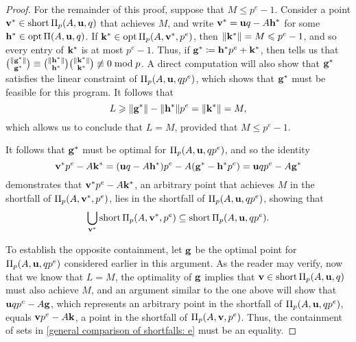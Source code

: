 \documentclass[11pt]{amsart}
\newcommand{\short}{\operatorname{short}}
\begin{document}
\begin{proof}
   For the remainder of this proof, suppose that $M \leq p^e-1$.
   Consider a point  $\vv{v}^{\ast} \in \short \IP_p(A, \vv{u}, q)$ that achieves $M$, and write $\mathbf{v}^{\ast} = \mathbf{u}q - A \mathbf{h}^{\ast}$ for some $\mathbf{h}^{\ast} \in \operatorname{opt} \Pi(A, \mathbf{u}, q)$.
   If $\mathbf{k}^{\ast} \in \operatorname{opt} \Pi_p(A, \mathbf{v}^{\ast}, p^e)$, then $\| \mathbf{k}^{\ast} \| = M \leqslant p^e-1$, and so every entry of $\mathbf{k}^{\ast}$ is at most $p^e - 1$.
   Thus, if $\mathbf{g}^{\ast} \coloneqq \mathbf{h}^{\ast} p^e + \mathbf{k}^{\ast}$, then  tells us that $\binom{\| \mathbf{g}^{\ast} \|}{\mathbf{g}^{\ast}} \equiv  \binom{\| \mathbf{h}^{\ast} \|}{\mathbf{h}^{\ast}} \binom{\| \mathbf{k}^{\ast} \|}{\mathbf{k}^{\ast}} \not \equiv 0 \bmod p$.
   A direct computation will also show that $\mathbf{g}^{\ast}$ satisfies the linear constraint of  $\Pi_p(A, \mathbf{u}, qp^e)$, which shows that $\mathbf{g}^{\ast}$ must be feasible for this program.
   It follows that
   \[ L \geqslant \| \mathbf{g}^{\ast} \| - \| \mathbf{h}^{\ast} \|p^e = \| \mathbf{k}^{\ast} \| = M, \]
   which allows us to conclude that $L=M$, provided that $M \leq p^e-1$.

   It follows that $\mathbf{g}^{\ast}$ must be optimal for $\Pi_p(A, \mathbf{u}, qp^e)$, and so the identity
   \[  \mathbf{v}^{\ast} p^e-A\mathbf{k}^{\ast} = (\mathbf{u}q-A\mathbf{h}^{\ast})p^e-A(\mathbf{g}^{\ast}-\mathbf{h}^{\ast}p^e) = \mathbf{u}qp^e-A \mathbf{g}^{\ast} \]
   demonstrates that $\mathbf{v}^{\ast} p^e-A\mathbf{k}^{\ast}$, an arbitrary point that achieves $M$ in the shortfall of $\Pi_p(A, \mathbf{v}^{\ast}, p^e)$, lies in the shortfall of $\Pi_p(A, \mathbf{u},qp^e)$, showing that
   \begin{equation}
      \label{general comparison of shortfalls: e}
      \bigcup_{\vv{v}^{\ast}} \short \IP_p(A, \vv{v}^{\ast}, p^e) \subseteq \short \IP_p(A, \vv{u}, qp^e).
   \end{equation}

   To establish the opposite containment, let $\mathbf{g}$ be the optimal point for $\Pi_p(A, \mathbf{u}, qp^e)$ considered earlier in this argument.
   As the reader may verify, now that we know that $L=M$, the optimality of $\mathbf{g}$ implies that $\vv{v} \in \short \IP_p(A, \vv{u}, q)$ must also achieve $M$, and an argument similar to the one above will show that $\mathbf{u}qp^e - A \mathbf{g}$, which represents an arbitrary point in the shortfall of $\Pi_p(A, \mathbf{u}, qp^e)$, equals $\mathbf{v}p^e-A\mathbf{k}$, a point in the shortfall of $\Pi_p(A, \mathbf{v}, p^e)$.
   Thus, the containment of sets in \eqref{general comparison of shortfalls: e} must be an equality.
\end{proof}
\end{document}
